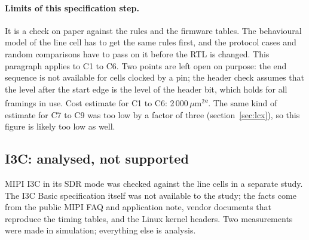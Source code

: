 \documentclass[10pt,a4paper]{article}
\newcommand{\est}{\textsuperscript{e}}
\begin{document}
\paragraph{Limits of this specification step.} It is a check on paper against the rules and the firmware tables.
The behavioural model of the line cell has to get the same rules first, and the protocol cases and random
comparisons have to pass on it before the RTL is changed. This paragraph applies to C1 to C6. Two points are left open on purpose: the end sequence is not available for cells clocked by
a pin; the header check assumes that the level after the start edge is the level of the header bit, which holds
for all framings in use. Cost estimate for C1 to C6: 2\,000\,$\mu$m$^2$\est. The same kind of estimate for C7 to C9 was too low by a factor of three (section~\ref{sec:lcx}), so this figure is likely too low as well.

\subsection{I3C: analysed, not supported}\label{sec:i3c}

MIPI I3C in its SDR mode was checked against the line cells in a separate study. The I3C Basic specification
itself was not available to the study; the facts come from the public MIPI FAQ and application note, vendor
documents that reproduce the timing tables, and the Linux kernel headers. Two measurements were made in
simulation; everything else is analysis.
\end{document}
